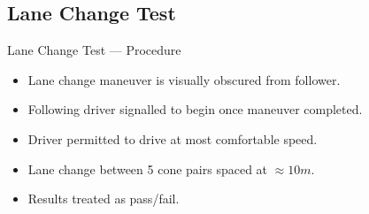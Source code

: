 \documentclass{beamer}
\begin{document}
  \subsection{Lane Change Test}

    \begin{frame}{Lane Change Test --- Procedure}
      \vspace{-30pt}
      \begin{figure}
        
      \end{figure}
      \vspace{-40pt}
      \begin{itemize} \footnotesize
        \item Lane change maneuver is visually obscured from follower.
        \item Following driver signalled to begin once maneuver completed.
        \item Driver permitted to drive at most comfortable speed.
        \item Lane change between 5 cone pairs spaced at $\approx10m$.
        \item Results treated as pass/fail.
      \end{itemize}
    \end{frame}
    
\end{document}
